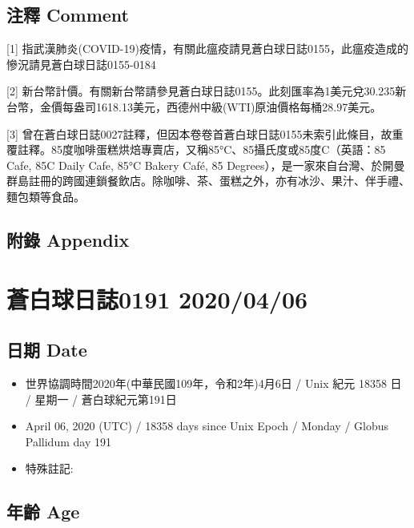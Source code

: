 \documentclass[a5paper, 11pt
]{book}
\providecommand{\tightlist}{%
  \setlength{\itemsep}{0pt}\setlength{\parskip}{0pt}}
\begin{document}
\hypertarget{ux6ce8ux91cb-comment-35}{%
\subsection{注釋 Comment}\label{ux6ce8ux91cb-comment-35}}

{[}1{]}
指武漢肺炎(COVID-19)疫情，有關此瘟疫請見蒼白球日誌0155，此瘟疫造成的慘況請見蒼白球日誌0155-0184

{[}2{]}
新台幣計價。有關新台幣請參見蒼白球日誌0155。此刻匯率為1美元兌30.235新台幣，金價每盎司1618.13美元，西德州中級(WTI)原油價格每桶28.97美元。

{[}3{]}
曾在蒼白球日誌0027註釋，但因本卷卷首蒼白球日誌0155未索引此條目，故重覆註釋。85度咖啡蛋糕烘焙專賣店，又稱85°C、85攝氏度或85度C（英語：85
Cafe, 85C Daily Cafe, 85°C Bakery Café, 85
Degrees），是一家來自台灣、於開曼群島註冊的跨國連鎖餐飲店。除咖啡、茶、蛋糕之外，亦有冰沙、果汁、伴手禮、麵包類等食品。

\hypertarget{ux9644ux9304-appendix-35}{%
\subsection{附錄 Appendix}\label{ux9644ux9304-appendix-35}}

\hypertarget{ux84bcux767dux7403ux65e5ux8a8c0191-20200406}{%
\section{蒼白球日誌0191
2020/04/06}\label{ux84bcux767dux7403ux65e5ux8a8c0191-20200406}}

\hypertarget{ux65e5ux671f-date-36}{%
\subsection{日期 Date}\label{ux65e5ux671f-date-36}}

\begin{itemize}
\tightlist
\item
  世界協調時間2020年(中華民國109年，令和2年)4月6日 / Unix 紀元 18358 日
  / 星期一 / 蒼白球紀元第191日
\item
  April 06, 2020 (UTC) / 18358 days since Unix Epoch / Monday / Globus
  Pallidum day 191
\item
  特殊註記:
\end{itemize}

\hypertarget{ux5e74ux9f61-age-36}{%
\subsection{年齡 Age}\label{ux5e74ux9f61-age-36}}
\end{document}
